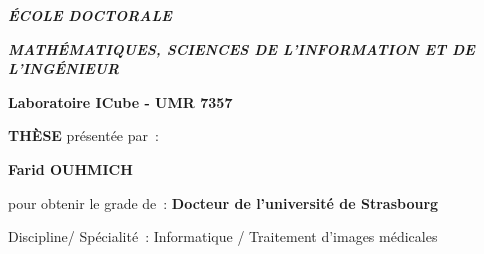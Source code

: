 \documentclass[]{memoir}
\begin{document}
\begin{titlingpage}
{
\centering


{\fontsize{14}{0}\selectfont \textbf{ \uppercase{\textit{\'{E}COLE DOCTORALE}}}}

\vspace{0.3cm}


{\fontsize{14}{0}\selectfont \textbf{ \uppercase{\textit{Math\'{e}matiques, Sciences de l'Information et de l'Ing\'{e}nieur}}}}

\vspace{0.5cm}

{\fontsize{16}{0}\selectfont \textbf{ Laboratoire ICube - UMR 7357}}

\vspace{1cm}

{\fontsize{22}{0}\selectfont \textbf{ \uppercase{\textsc{Th\`ese}}}} \hspace{0.2cm} {\fontsize{12}{0}\selectfont pr\'esent\'ee par~:}

\vspace{0.5cm}

{\fontsize{18}{0}\selectfont \textbf{ Farid OUHMICH}}


\vspace{2cm}


{\fontsize{13}{0}\selectfont pour obtenir le grade de~: \textbf{Docteur de l'universit\'e de
Strasbourg}}

\vspace{0.4cm}

{\fontsize{12}{0}\selectfont Discipline/ Sp\'ecialit\'e~: Informatique / Traitement d'images m\'edicales}


\vspace{2cm}

{\setlength{\fboxrule}{1pt}
\fbox{\parbox[c][3.5cm]{16cm}{
\centering\fontsize{23}{0}\selectfont \textbf{{\thetitle}}}}}

\vspace{3cm}
}

%


{
\fontsize{12}{2}\selectfont 
%		
	

}
\end{titlingpage}
\end{document}
